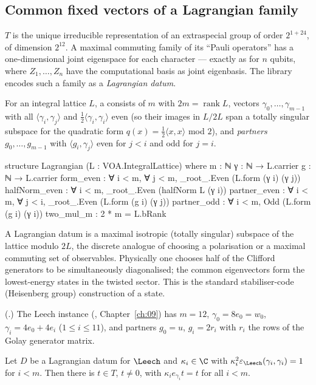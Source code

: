 \subsection{Common fixed vectors of a Lagrangian family}
$T$ is the unique irreducible representation of an extraspecial group of order $2^{1+24}$, of dimension
$2^{12}$. A maximal commuting family of its ``Pauli operators'' has a one-dimensional joint eigenspace
for each character --- exactly as for $n$ qubits, where $Z_1,\dots,Z_n$ have the computational basis as
joint eigenbasis. The library encodes such a family as a \emph{Lagrangian datum}.
\begin{definition}\label{ch13:def:lagrangian}
For an integral lattice $L$, a  consists of $m$ with $2m=\operatorname{rank}L$, vectors
$\gamma_0,\dots,\gamma_{m-1}$ with all $\langle\gamma_i,\gamma_j\rangle$ and $\tfrac12\langle\gamma_i,\gamma_i\rangle$ even (so their images in
$L/2L$ span a totally singular subspace for the quadratic form $q(x)=\tfrac12\langle x,x\rangle$ mod $2$), and
\emph{partners} $g_0,\dots,g_{m-1}$ with $\langle g_i,\gamma_j\rangle$ even for $j<i$ and odd for $j=i$.
\end{definition}
\begin{leancode}
structure Lagrangian (L : VOA.IntegralLattice) where
  m : ℕ
  γ : ℕ → L.carrier
  g : ℕ → L.carrier
  form_even : ∀ i < m, ∀ j < m, _root_.Even (L.form (γ i) (γ j))
  halfNorm_even : ∀ i < m, _root_.Even (halfNorm L (γ i))
  partner_even : ∀ i < m, ∀ j < i, _root_.Even (L.form (g i) (γ j))
  partner_odd : ∀ i < m, Odd (L.form (g i) (γ i))
  two_mul_m : 2 * m = L.bRank
\end{leancode}
\begin{physics}
A Lagrangian datum is a maximal isotropic (totally singular) subspace of the lattice modulo $2L$, the discrete analogue of choosing a polarisation or a maximal commuting set of observables. Physically one chooses half of the Clifford generators to be simultaneously diagonalised; the common eigenvectors form the lowest-energy states in the twisted sector. This is the standard stabiliser-code (Heisenberg group) construction of a state.
\end{physics}
(.) The Leech instance 
(, Chapter~\ref{ch:09}) has $m=12$, $\gamma_0=8e_0=w_0$, $\gamma_i=4e_0+4e_i$
($1\le i\le11$), and partners $g_0=u$, $g_i=2r_i$ with $r_i$ the rows of the Golay generator matrix.
\begin{theorem}\label{ch13:thm:fixed}
Let $D$ be a Lagrangian datum for $\Leech$ and $\kappa_i\in\C$ with $\kappa_i^2\varepsilon_\Leech(\gamma_i,\gamma_i)=1$ for $i<m$.
Then there is $t\in T$, $t\ne0$, with $\kappa_ie_{\gamma_i}t=t$ for all $i<m$.
\end{theorem}
